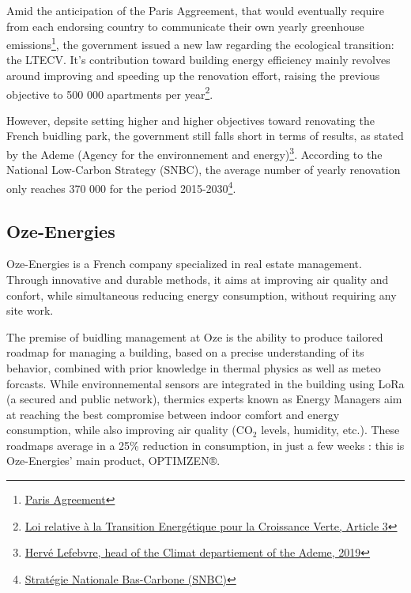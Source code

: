 \documentclass[12pt]{article}
\begin{document}
Amid the anticipation of the Paris Aggreement, that would eventually require from each endorsing country to communicate their own yearly greenhouse emissions\footnote{\href{https://unfccc.int/files/meetings/paris_nov_2015/application/pdf/paris_agreement_english_.pdf}{Paris Agreement}}, the government issued a new law regarding the ecological transition: the LTECV. It's contribution toward building energy efficiency mainly revolves around improving and speeding up the renovation effort, raising the previous objective to 500 000 apartments per year\footnote{\href{https://www.legifrance.gouv.fr/jorf/id/JORFTEXT000031044385/}{Loi relative à la Transition Energétique pour la Croissance Verte, Article 3}}.

However, depsite setting higher and higher objectives toward renovating the French buidling park, the government still falls short in terms of results, as stated by the Ademe (Agency for the environnement and energy)\footnote{\href{https://www.lefigaro.fr/conjoncture/accord-de-paris-pourquoi-les-pays-ne-sont-pas-a-la-hauteur-de-leurs-engagements-20190419}{Hervé Lefebvre, head of the Climat departiement of the Ademe, 2019}}. According to the National Low-Carbon Strategy (SNBC), the average number of yearly renovation only reaches 370 000 for the period 2015-2030\footnote{\href{https://www.ecologie.gouv.fr/strategie-nationale-bas-carbone-snbc}{Stratégie Nationale Bas-Carbone (SNBC)}}.

\subsection{Oze-Energies}

Oze-Energies is a French company specialized in real estate management. Through innovative and durable methods, it aims at improving air quality and confort, while simultaneous reducing energy consumption, without requiring any site work.

The premise of buidling management at Oze is the ability to produce tailored roadmap for managing a building, based on a precise understanding of its behavior, combined with prior knowledge in thermal physics as well as meteo forcasts. While environnemental sensors are integrated in the building using LoRa (a secured and public network), thermics experts known as Energy Managers aim at reaching the best compromise between indoor comfort and energy consumption, while also improving air quality (\ensuremath{\mathrm{CO_2}} levels, humidity, etc.). These roadmaps average in a 25\% reduction in consumption, in just a few weeks : this is Oze-Energies' main product, OPTIMZEN®.
\end{document}

